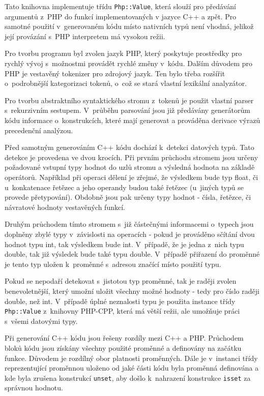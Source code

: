 \documentclass[czech]{ExcelAtFIT}
\newcommand{\function}[1]{\texttt{#1}}
\begin{document}
	Tato knihovna implementuje třídu \function{Php::Value}, která slouží pro předávání argumentů z~PHP do funkcí implementovaných v jazyce C++ a zpět. Pro samotné použití v~generovaném kódu místo nativních typů není vhodná, jelikož její provázání s~PHP interpretem má vysokou režii.

	Pro tvorbu programu byl zvolen jazyk PHP, který poskytuje prostředky pro rychlý vývoj s~možnostmi provádět rychlé změny v~kódu. Dalším důvodem pro PHP je vestavěný tokenizer pro zdrojový jazyk. Ten bylo třeba rozšířit o~podrobnější kategorizaci tokenů, o~což se stará vlastní lexikální analyzátor.

	Pro tvorbu abstraktního syntaktického stromu z~tokenů je použit vlastní parser s~rekurzivním sestupem. V~průběhu parsování jsou již předávány generátorům kódu informace o~konstrukcích, které mají generovat a prováděna derivace výrazů precedenční analýzou.

	Před samotným generováním C++ kódu dochází k~detekci datových typů. Tato detekce je provedena ve dvou krocích. Při prvním průchodu stromem jsou určeny požadované vstupní typy hodnot do uzlů stromu a výsledná hodnota na základě operátorů. Například při operaci dělení je zřejmé, že výsledkem bude typ float, či u~konkatenace řetězec a jeho operandy budou také řetězec (u~jiných typů se provede přetypování). Obdobně jsou pak určeny typy hodnot - čísla, řetězce, či návratové hodnoty vestavěných funkcí.

	Druhým průchodem tímto stromem s~již částečnými informacemi o~typech jsou doplněny zbylé typy v~zá\-vis\-los\-ti na operacích - pokud je prováděno sčítání dvou hodnot typu int, tak výsledkem bude int. V~případě, že je jedna z~nich typu double, tak již výsledek bude také typu double. V~případě přiřazení do proměnné je tento typ uložen k~proměnné s~adresou značící místo použití typu.

	Pokud se nepodaří detekovat s~jistotou typ pro\-měn\-né, tak je raději zvolen benevoletnější, který umožní uložit všechny možné hodnoty - tedy pro číslo raději double, než int. V~případě úplné neznalosti typu je použita instance třídy \function{Php::Value} z~knihovny PHP-CPP, která má větší režii, ale umožňuje práci s~všemi datovými typy\cite{phpCppPerformance}.

	Při generování C++ kódu jsou řešeny rozdíly mezi C++ a PHP. Průchodem bloků kódu jsou získány všech\-ny použité proměnné a definovány na začátku funkce. Důvodem je rozdílný obor platnosti proměnných. Dále je v~instanci třídy reprezentující proměnnou uloženo od jaké části kódu byla proměnná definována a kde byla zrušena konstrukcí \function{unset}, aby došlo k~nahrazení konstrukce \function{isset} za správnou hodnotu.
\end{document}
